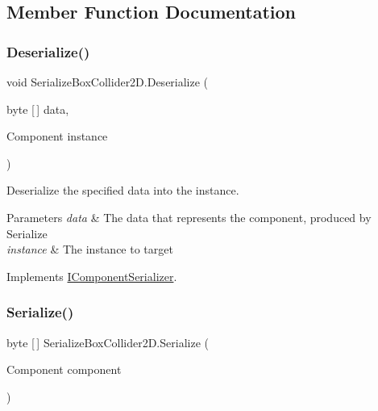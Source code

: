 \subsection{Member Function Documentation}
\mbox{\label{class_serialize_box_collider2_d_ad00de81c7e9e81bc30beb97194f34e17}} 
\subsubsection{\texorpdfstring{Deserialize()}{Deserialize()}}
{\footnotesize\ttfamily void Serialize\+Box\+Collider2\+D.\+Deserialize (\begin{DoxyParamCaption}\item[{byte \mbox{[}$\,$\mbox{]}}]{data,  }\item[{Component}]{instance }\end{DoxyParamCaption})\hspace{0.3cm}{\ttfamily [inline]}}



Deserialize the specified data into the instance. 


\begin{DoxyParams}{Parameters}
{\em data} & The data that represents the component, produced by Serialize \\
\hline
{\em instance} & The instance to target \\
\hline
\end{DoxyParams}


Implements \hyperlink{interface_i_component_serializer_a4cc366a5c78b33d47a90c209d8fed883}{I\+Component\+Serializer}.

\mbox{\label{class_serialize_box_collider2_d_ab002b432810dbe5029e486b8f0a85878}} 
\subsubsection{\texorpdfstring{Serialize()}{Serialize()}}
{\footnotesize\ttfamily byte \mbox{[}$\,$\mbox{]} Serialize\+Box\+Collider2\+D.\+Serialize (\begin{DoxyParamCaption}\item[{Component}]{component }\end{DoxyParamCaption})\hspace{0.3cm}{\ttfamily [inline]}}




